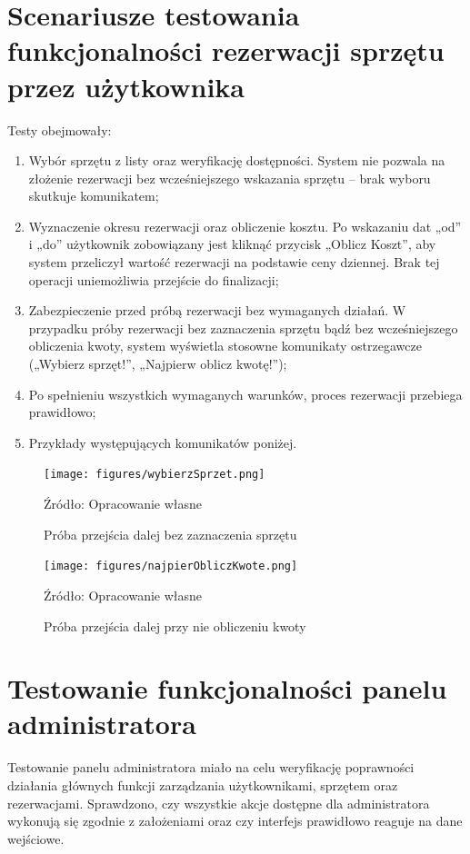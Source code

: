 \section{Scenariusze testowania funkcjonalności rezerwacji sprzętu przez użytkownika}
\label{sec:rezerwacjaSprzetuTest}
Testy obejmowały:
\begin{enumerate}%
\item Wybór sprzętu z listy oraz weryfikację dostępności. System nie pozwala na złożenie rezerwacji bez wcześniejszego wskazania sprzętu – brak wyboru skutkuje komunikatem;
\item Wyznaczenie okresu rezerwacji oraz obliczenie kosztu. Po wskazaniu dat „od” i „do” użytkownik zobowiązany jest kliknąć przycisk „Oblicz Koszt”, aby system przeliczył wartość rezerwacji na podstawie ceny dziennej. Brak tej operacji uniemożliwia przejście do finalizacji;
\item Zabezpieczenie przed próbą rezerwacji bez wymaganych działań. W przypadku próby rezerwacji bez zaznaczenia sprzętu bądź bez wcześniejszego obliczenia kwoty, system wyświetla stosowne komunikaty ostrzegawcze („Wybierz sprzęt!”, „Najpierw oblicz kwotę!”);
\item Po spełnieniu wszystkich wymaganych warunków, proces rezerwacji przebiega prawidłowo;
\item Przykłady występujących komunikatów poniżej.
\end{enumerate}

\vspace{-0.2cm}
\begin{figure}[!htbp]
    \centering
    \texttt{[image: figures/wybierzSprzet.png]}
    \caption{Próba przejścia dalej bez zaznaczenia sprzętu}
    \label{fig:niezaznaczonySprzet}
    \small{Źródło: Opracowanie własne}
\end{figure}

\vspace{-0.2cm}
\begin{figure}[!htbp]
    \centering
    \texttt{[image: figures/najpierObliczKwote.png]}
    \caption{Próba przejścia dalej przy nie obliczeniu kwoty}
    \label{fig:brakObliczonejKwoty}
    \small{Źródło: Opracowanie własne}
\end{figure}

\section{Testowanie funkcjonalności panelu administratora}
\label{sec:TestowanieFunkcjonalnosci }
Testowanie panelu administratora miało na celu weryfikację poprawności działania głównych funkcji zarządzania użytkownikami, sprzętem oraz rezerwacjami. Sprawdzono, czy wszystkie akcje dostępne dla administratora wykonują się zgodnie z założeniami oraz czy interfejs prawidłowo reaguje na dane wejściowe.
